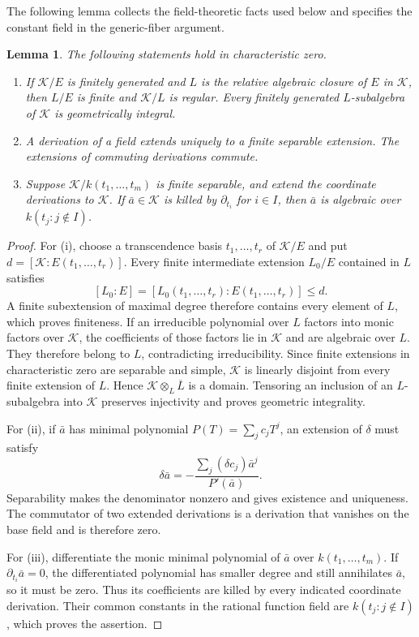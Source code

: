 \documentclass[11pt,reqno]{amsart}
\newtheorem{lemma}[theorem]{Lemma}
\theoremstyle{definition}
\theoremstyle{remark}
\numberwithin{equation}{section}
\begin{document}
The following lemma collects the field-theoretic facts used below and specifies the constant field in the generic-fiber argument.

\begin{lemma}\label{lem:field-facts}
The following statements hold in characteristic zero.
\begin{enumerate}
\item If $\mathcal K/E$ is finitely generated and $L$ is the relative algebraic closure of $E$ in $\mathcal K$, then $L/E$ is finite and $\mathcal K/L$ is regular. Every finitely generated $L$-subalgebra of $\mathcal K$ is geometrically integral.
\item A derivation of a field extends uniquely to a finite separable extension. The extensions of commuting derivations commute.
\item Suppose $\mathcal K/k(t_1,\ldots,t_m)$ is finite separable, and extend the coordinate derivations to $\mathcal K$. If $\bar{a}\in \mathcal K$ is killed by $\partial_{t_i}$ for $i\in I$, then $\bar{a}$ is algebraic over $k(t_j:j\notin I)$.
\end{enumerate}
\end{lemma}

\begin{proof}
For (i), choose a transcendence basis $t_1,\ldots,t_r$ of $\mathcal K/E$ and put $d=[\mathcal K:E(t_1,\ldots,t_r)]$. Every finite intermediate extension $L_0/E$ contained in $L$ satisfies
\[
 [L_0:E]=[L_0(t_1,\ldots,t_r):E(t_1,\ldots,t_r)]\leq d.
\]
A finite subextension of maximal degree therefore contains every element of $L$, which proves finiteness. If an irreducible polynomial over $L$ factors into monic factors over $\mathcal K$, the coefficients of those factors lie in $\mathcal K$ and are algebraic over $L$. They therefore belong to $L$, contradicting irreducibility. Since finite extensions in characteristic zero are separable and simple, $\mathcal K$ is linearly disjoint from every finite extension of $L$. Hence $\mathcal K\otimes_L\overline L$ is a domain. Tensoring an inclusion of an $L$-subalgebra into $\mathcal K$ preserves injectivity and proves geometric integrality.

For (ii), if $\bar{a}$ has minimal polynomial $P(T)=\sum_j c_jT^j$, an extension of $\delta$ must satisfy
\[
 \delta \bar{a}=-\frac{\sum_j(\delta c_j)\bar{a}^j}{P'(\bar{a})}.
\]
Separability makes the denominator nonzero and gives existence and uniqueness. The commutator of two extended derivations is a derivation that vanishes on the base field and is therefore zero.

For (iii), differentiate the monic minimal polynomial of $\bar{a}$ over $k(t_1,\ldots,t_m)$. If $\partial_{t_i}\bar{a}=0$, the differentiated polynomial has smaller degree and still annihilates $\bar{a}$, so it must be zero. Thus its coefficients are killed by every indicated coordinate derivation. Their common constants in the rational function field are $k(t_j:j\notin I)$, which proves the assertion.
\end{proof}
\end{document}
